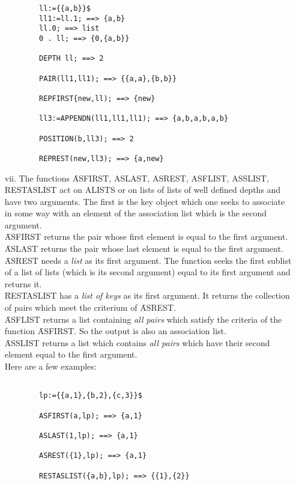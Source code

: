 \begin{itemize}
\begin{verbatim}
        ll:={{a,b}}$
        ll1:=ll.1; ==> {a,b}
        ll.0; ==> list
        0 . ll; ==> {0,{a,b}}

        DEPTH ll; ==> 2

        PAIR(ll1,ll1); ==> {{a,a},{b,b}}

        REPFIRST{new,ll); ==> {new}

        ll3:=APPENDN(ll1,ll1,ll1); ==> {a,b,a,b,a,b}

        POSITION(b,ll3); ==> 2

        REPREST(new,ll3); ==> {a,new}

\end{verbatim}
\item[vii.]
The functions \f{ASFIRST, ASLAST, ASREST, ASFLIST, ASSLIST, \\RESTASLIST}
act on ALISTS or on lists of lists of well defined depths
and have two arguments. The first is the key object
which one seeks to associate in some way with an element of the association
list which is the second argument.\\
\f{ASFIRST} returns the pair whose first element is equal to the
first argument.\\
\f{ASLAST} returns the pair whose last element is equal to the first
argument.\\
\f{ASREST} needs a {\em list} as its first argument. The function
seeks the first sublist of a list of lists (which is its second argument)
equal to its first argument and returns it.\\
\f{RESTASLIST} has a {\em list of keys} as its first argument. It
returns the collection of pairs which meet the criterium of \f{ASREST}.\\
\f{ASFLIST} returns a list containing {\em all pairs} which
satisfy the criteria of the function \f{ASFIRST}. So the output
is also an association list.\\
\f{ASSLIST} returns a list which contains {\em all pairs} which have
their second element equal to the first argument.\\
Here are a few examples:
\begin{verbatim}

        lp:={{a,1},{b,2},{c,3}}$

        ASFIRST(a,lp); ==> {a,1}

        ASLAST(1,lp); ==> {a,1}

        ASREST({1},lp); ==> {a,1}

        RESTASLIST({a,b},lp); ==> {{1},{2}}


\end{verbatim}
\end{itemize}
